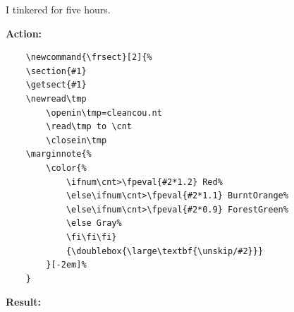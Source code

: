 \documentclass[12pt]{article}
\begin{document}
I tinkered for five hours. 

\textbf{Action:} \begin{verbatim}
    \newcommand{\frsect}[2]{%
    \section{#1}
    \getsect{#1}
    \newread\tmp      
        \openin\tmp=cleancou.nt
        \read\tmp to \cnt
        \closein\tmp
    \marginnote{%
        \color{%
            \ifnum\cnt>\fpeval{#2*1.2} Red%
            \else\ifnum\cnt>\fpeval{#2*1.1} BurntOrange%
            \else\ifnum\cnt>\fpeval{#2*0.9} ForestGreen%
            \else Gray%
            \fi\fi\fi}
            {\doublebox{\large\textbf{\unskip/#2}}}
        }[-2em]%
    }
\end{verbatim}

\textbf{Result:} 

\end{document}
